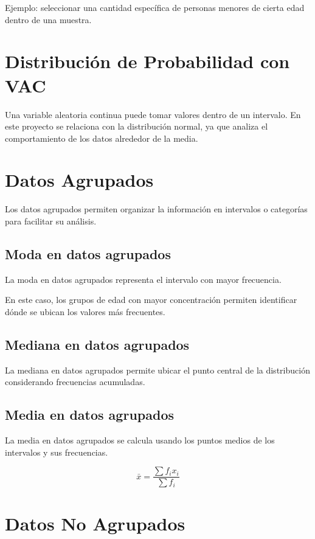 \documentclass[12pt]{article}
\begin{document}
Ejemplo: seleccionar una cantidad específica de personas menores de cierta edad dentro de una muestra.

\section{Distribución de Probabilidad con VAC}

Una variable aleatoria continua puede tomar valores dentro de un intervalo. En este proyecto se relaciona con la distribución normal, ya que analiza el comportamiento de los datos alrededor de la media.

\section{Datos Agrupados}

Los datos agrupados permiten organizar la información en intervalos o categorías para facilitar su análisis.

\subsection{Moda en datos agrupados}

La moda en datos agrupados representa el intervalo con mayor frecuencia.

En este caso, los grupos de edad con mayor concentración permiten identificar dónde se ubican los valores más frecuentes.

\subsection{Mediana en datos agrupados}

La mediana en datos agrupados permite ubicar el punto central de la distribución considerando frecuencias acumuladas.

\subsection{Media en datos agrupados}

La media en datos agrupados se calcula usando los puntos medios de los intervalos y sus frecuencias.

\[
\bar{x}=\frac{\sum f_i x_i}{\sum f_i}
\]

\section{Datos No Agrupados}
\end{document}
